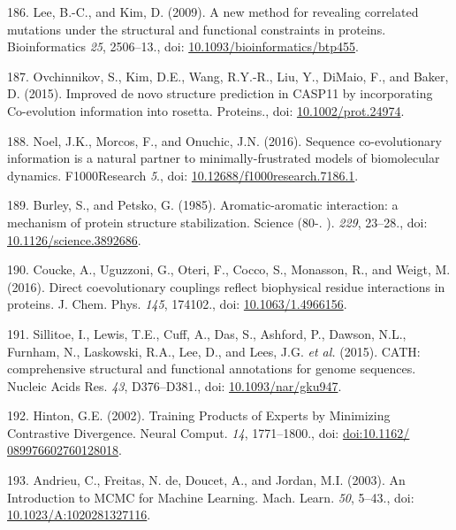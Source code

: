 \documentclass[11pt,a4paper,twoside]{book}
\theoremstyle{definition}
\theoremstyle{definition}
\theoremstyle{remark}
\begin{document}
\hypertarget{ref-Lee2009}{}
186. Lee, B.-C., and Kim, D. (2009). A new method for revealing
correlated mutations under the structural and functional constraints in
proteins. Bioinformatics \emph{25}, 2506--13., doi:
\href{https://doi.org/10.1093/bioinformatics/btp455}{10.1093/bioinformatics/btp455}.

\hypertarget{ref-Ovchinnikov2015b}{}
187. Ovchinnikov, S., Kim, D.E., Wang, R.Y.-R., Liu, Y., DiMaio, F., and
Baker, D. (2015). Improved de novo structure prediction in CASP11 by
incorporating Co-evolution information into rosetta. Proteins., doi:
\href{https://doi.org/10.1002/prot.24974}{10.1002/prot.24974}.

\hypertarget{ref-Noel2016}{}
188. Noel, J.K., Morcos, F., and Onuchic, J.N. (2016). Sequence
co-evolutionary information is a natural partner to minimally-frustrated
models of biomolecular dynamics. F1000Research \emph{5}., doi:
\href{https://doi.org/10.12688/f1000research.7186.1}{10.12688/f1000research.7186.1}.

\hypertarget{ref-Burley1985}{}
189. Burley, S., and Petsko, G. (1985). Aromatic-aromatic interaction: a
mechanism of protein structure stabilization. Science (80-. ).
\emph{229}, 23--28., doi:
\href{https://doi.org/10.1126/science.3892686}{10.1126/science.3892686}.

\hypertarget{ref-Coucke2016}{}
190. Coucke, A., Uguzzoni, G., Oteri, F., Cocco, S., Monasson, R., and
Weigt, M. (2016). Direct coevolutionary couplings reflect biophysical
residue interactions in proteins. J. Chem. Phys. \emph{145}, 174102.,
doi: \href{https://doi.org/10.1063/1.4966156}{10.1063/1.4966156}.

\hypertarget{ref-Sillitoe2015}{}
191. Sillitoe, I., Lewis, T.E., Cuff, A., Das, S., Ashford, P., Dawson,
N.L., Furnham, N., Laskowski, R.A., Lee, D., and Lees, J.G. \emph{et
al.} (2015). CATH: comprehensive structural and functional annotations
for genome sequences. Nucleic Acids Res. \emph{43}, D376--D381., doi:
\href{https://doi.org/10.1093/nar/gku947}{10.1093/nar/gku947}.

\hypertarget{ref-Hinton2002}{}
192. Hinton, G.E. (2002). Training Products of Experts by Minimizing
Contrastive Divergence. Neural Comput. \emph{14}, 1771--1800., doi:
\href{https://doi.org/doi:10.1162/\%20089976602760128018}{doi:10.1162/ 089976602760128018}.

\hypertarget{ref-Andrieu2003}{}
193. Andrieu, C., Freitas, N. de, Doucet, A., and Jordan, M.I. (2003).
An Introduction to MCMC for Machine Learning. Mach. Learn. \emph{50},
5--43., doi:
\href{https://doi.org/10.1023/A:1020281327116}{10.1023/A:1020281327116}.
\end{document}
